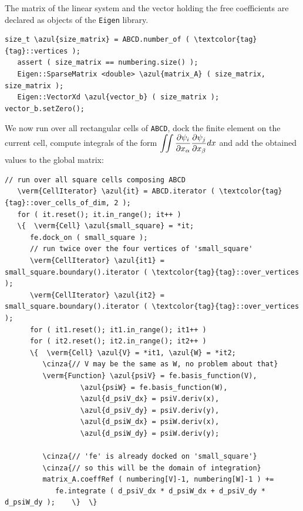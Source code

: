 The matrix of the linear system and the vector holding the free coefficients
are declared as objects of the {\small\tt Eigen} library.

\begin{Verbatim}[commandchars=\\\{\},formatcom=\small\tt,frame=single,
   label=parag-\ref{\numb section 6.\numb parag 2}.cpp,rulecolor=\color{coment},
   baselinestretch=0.94,framesep=2mm                                            ]
   size_t \azul{size_matrix} = ABCD.number_of ( \textcolor{tag}{tag}::vertices );
   assert ( size_matrix == numbering.size() );
   Eigen::SparseMatrix <double> \azul{matrix_A} ( size_matrix, size_matrix );
   Eigen::VectorXd \azul{vector_b} ( size_matrix );  vector_b.setZero();
\end{Verbatim}
\vskip 1mm

We now run over all rectangular cells of {\small\tt ABCD}, dock the finite element
on the current cell,
compute integrals of the form $ \displaystyle \int\!\!\!\int {\partial \psi_i \over
\partial x_\alpha} {\partial \psi_j \over \partial x_\beta} dx $ and add the obtained
values to the global matrix:
\vskip 1mm

\begin{Verbatim}[commandchars=\\\{\},formatcom=\small\tt,frame=single,
   label=parag-\ref{\numb section 6.\numb parag 2}.cpp,rulecolor=\color{coment},
   baselinestretch=0.94,framesep=2mm                                            ]
   // run over all square cells composing ABCD
   \verm{CellIterator} \azul{it} = ABCD.iterator ( \textcolor{tag}{tag}::over_cells_of_dim, 2 );
   for ( it.reset(); it.in_range(); it++ )
   \{  \verm{Cell} \azul{small_square} = *it;
      fe.dock_on ( small_square );
      // run twice over the four vertices of 'small_square'
      \verm{CellIterator} \azul{it1} = small_square.boundary().iterator ( \textcolor{tag}{tag}::over_vertices );
      \verm{CellIterator} \azul{it2} = small_square.boundary().iterator ( \textcolor{tag}{tag}::over_vertices );
      for ( it1.reset(); it1.in_range(); it1++ )
      for ( it2.reset(); it2.in_range(); it2++ )
      \{  \verm{Cell} \azul{V} = *it1, \azul{W} = *it2;
         \cinza{// V may be the same as W, no problem about that}
         \verm{Function} \azul{psiV} = fe.basis_function(V),
                  \azul{psiW} = fe.basis_function(W),
                  \azul{d_psiV_dx} = psiV.deriv(x),
                  \azul{d_psiV_dy} = psiV.deriv(y),
                  \azul{d_psiW_dx} = psiW.deriv(x),
                  \azul{d_psiW_dy} = psiW.deriv(y);
                  
         \cinza{// 'fe' is already docked on 'small_square'}
         \cinza{// so this will be the domain of integration}
         matrix_A.coeffRef ( numbering[V]-1, numbering[W]-1 ) +=
            fe.integrate ( d_psiV_dx * d_psiW_dx + d_psiV_dy * d_psiW_dy );    \}  \}
\end{Verbatim}

